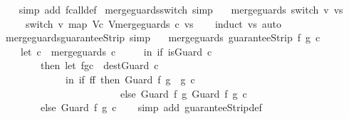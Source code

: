 \begin{isabellebody}
%
\isadelimproof
\ \ %
\endisadelimproof
%
\isatagproof
{}\isamarkupfalse%
\ {\isacharparenleft}simp\ add{\isacharcolon}\ fcall{\isacharunderscore}def{\isacharparenright}%
\endisatagproof
{\isafoldproof}%
%
\isadelimproof
\isanewline
%
\endisadelimproof
\isanewline
{}\isamarkupfalse%
\ merge{\isacharunderscore}guards{\isacharunderscore}switch\ {\isacharbrackleft}simp{\isacharbrackright}{\isacharcolon}\ \isanewline
\ \ {\isachardoublequoteopen}merge{\isacharunderscore}guards\ {\isacharparenleft}switch\ v\ vs{\isacharparenright}\ {\isacharequal}\ \isanewline
\ \ \ \ \ switch\ v\ {\isacharparenleft}map\ {\isacharparenleft}{\isasymlambda}{\isacharparenleft}V{\isacharcomma}c{\isacharparenright}{\isachardot}\ {\isacharparenleft}V{\isacharcomma}merge{\isacharunderscore}guards\ c{\isacharparenright}{\isacharparenright}\ vs{\isacharparenright}{\isachardoublequoteclose}\isanewline
%
\isadelimproof
\ \ %
\endisadelimproof
%
\isatagproof
{}\isamarkupfalse%
\ {\isacharparenleft}induct\ vs{\isacharparenright}\ auto%
\endisatagproof
{\isafoldproof}%
%
\isadelimproof
\isanewline
%
\endisadelimproof
\isanewline
{}\isamarkupfalse%
\ merge{\isacharunderscore}guards{\isacharunderscore}guaranteeStrip\ {\isacharbrackleft}simp{\isacharbrackright}{\isacharcolon}\ \isanewline
\ \ {\isachardoublequoteopen}merge{\isacharunderscore}guards\ {\isacharparenleft}guaranteeStrip\ f\ g\ c{\isacharparenright}\ {\isacharequal}\ \isanewline
\ \ \ \ {\isacharparenleft}let\ c{\isacharprime}\ {\isacharequal}\ {\isacharparenleft}merge{\isacharunderscore}guards\ c{\isacharparenright}\isanewline
\ \ \ \ \ in\ if\ is{\isacharunderscore}Guard\ c{\isacharprime}\ \isanewline
\ \ \ \ \ \ \ \ then\ let\ {\isacharparenleft}f{\isacharprime}{\isacharcomma}g{\isacharprime}{\isacharcomma}c{\isacharprime}{\isacharparenright}\ {\isacharequal}\ dest{\isacharunderscore}Guard\ c{\isacharprime}\ \isanewline
\ \ \ \ \ \ \ \ \ \ \ \ \ in\ if\ f{\isacharequal}f{\isacharprime}\ then\ Guard\ f\ {\isacharparenleft}g\ {\isasyminter}\ g{\isacharprime}{\isacharparenright}\ c{\isacharprime}\ \isanewline
\ \ \ \ \ \ \ \ \ \ \ \ \ \ \ \ \ \ \ \ \ \ \ \ else\ Guard\ f\ g\ {\isacharparenleft}Guard\ f{\isacharprime}\ g{\isacharprime}\ c{\isacharprime}{\isacharparenright}\isanewline
\ \ \ \ \ \ \ \ else\ Guard\ f\ g\ c{\isacharprime}{\isacharparenright}{\isachardoublequoteclose}\isanewline
%
\isadelimproof
\ \ %
\endisadelimproof
%
\isatagproof
{}\isamarkupfalse%
\ {\isacharparenleft}simp\ add{\isacharcolon}\ guaranteeStrip{\isacharunderscore}def{\isacharparenright}%

\end{isabellebody}
